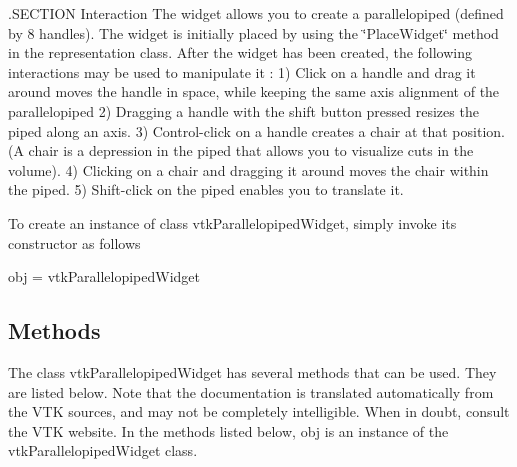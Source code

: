 .S\-E\-C\-T\-I\-O\-N Interaction The widget allows you to create a parallelopiped (defined by 8 handles). The widget is initially placed by using the \char`\"{}\-Place\-Widget\char`\"{} method in the representation class. After the widget has been created, the following interactions may be used to manipulate it \-: 1) Click on a handle and drag it around moves the handle in space, while keeping the same axis alignment of the parallelopiped 2) Dragging a handle with the shift button pressed resizes the piped along an axis. 3) Control-\/click on a handle creates a chair at that position. (A chair is a depression in the piped that allows you to visualize cuts in the volume). 4) Clicking on a chair and dragging it around moves the chair within the piped. 5) Shift-\/click on the piped enables you to translate it.

To create an instance of class vtk\-Parallelopiped\-Widget, simply invoke its constructor as follows \begin{DoxyVerb}  obj = vtkParallelopipedWidget
\end{DoxyVerb}
 \hypertarget{vtkwidgets_vtkxyplotwidget_Methods}{}\subsection{Methods}\label{vtkwidgets_vtkxyplotwidget_Methods}
The class vtk\-Parallelopiped\-Widget has several methods that can be used. They are listed below. Note that the documentation is translated automatically from the V\-T\-K sources, and may not be completely intelligible. When in doubt, consult the V\-T\-K website. In the methods listed below, {\ttfamily obj} is an instance of the vtk\-Parallelopiped\-Widget class. 
